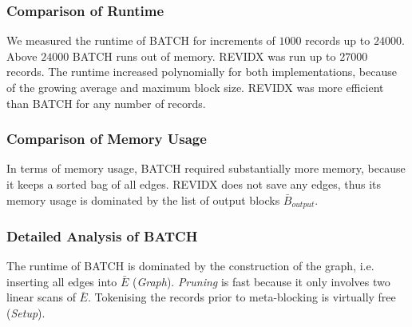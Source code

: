 \documentclass[a4paper,12pt]{article}
\begin{document}
\subsubsection{Comparison of Runtime}
We measured the runtime of BATCH for increments of $1000$ records up to $24000$. Above $24000$ BATCH runs out of memory. REVIDX was run up to $27000$ records.
The runtime increased polynomially for both implementations, because of the growing average and maximum block size. REVIDX was more efficient than BATCH for any number of records. 

\begin{center}
\end{center}

\subsubsection{Comparison of Memory Usage}
In terms of memory usage, BATCH required substantially more memory, because it keeps a sorted bag of all edges. REVIDX does not save any edges, thus its memory usage is dominated by the list of output blocks $\bar B_{output}$.

\begin{center}
\end{center}

\subsubsection{Detailed Analysis of BATCH}
The runtime of BATCH is dominated by the construction of the graph, i.e. inserting all edges into $\bar E$ (\emph{Graph}). \emph{Pruning} is fast because it only involves two linear scans of $\bar E$. Tokenising the records prior to meta-blocking is virtually free (\emph{Setup}). 
\end{document}
